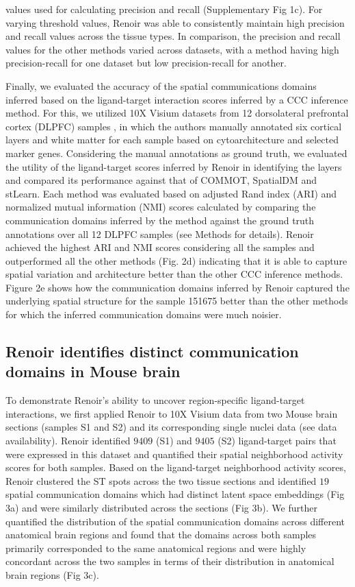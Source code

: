 values used for calculating precision and recall (Supplementary Fig 1c). For varying threshold values, Renoir was able to consistently maintain high precision and recall values across the tissue types. In comparison, the precision and recall values for the other methods varied across datasets, with a method having high precision-recall for one dataset but low precision-recall for another. \par 

Finally, we evaluated the accuracy of the spatial communications domains inferred based on the ligand-target interaction scores inferred by a CCC inference method. For this, we utilized 10X Visium datasets from 12 dorsolateral prefrontal cortex (DLPFC) samples \citep{Maynard2021}, in which the authors manually annotated six cortical layers and white matter for each sample based on cytoarchitecture and selected marker genes. Considering the manual annotations as ground truth, we evaluated the utility of the ligand-target scores inferred by Renoir in identifying the layers and compared its performance against that of COMMOT, SpatialDM and stLearn. Each method was evaluated based on adjusted Rand index (ARI) and normalized mutual information (NMI) scores calculated by comparing the communication domains inferred by the method against the ground truth annotations over all 12 DLPFC samples (see Methods for details). Renoir achieved the highest ARI and NMI scores considering all the samples and outperformed all the other methods (Fig. 2d) indicating that it is able to capture spatial variation and architecture better than the other CCC inference methods. Figure 2e shows how the communication domains inferred by Renoir captured the underlying spatial structure for the sample 151675 better than the other methods for which the inferred communication domains were much noisier.

\subsection*{Renoir identifies distinct communication domains in Mouse brain}

To demonstrate Renoir's ability to uncover region-specific ligand-target interactions, we first applied Renoir to 10X Visium data from two Mouse brain sections (samples S1 and S2) and its corresponding single nuclei data \citep{Kleshchevnikov2022} (see data availability). Renoir identified $9409$ (S1) and $9405$ (S2) ligand-target pairs that were expressed in this dataset and quantified their spatial neighborhood activity scores for both samples. Based on the ligand-target neighborhood activity scores, Renoir clustered the ST spots across the two tissue sections and identified $19$ spatial communication domains which had distinct latent space embeddings (Fig 3a) and were similarly distributed across the sections (Fig 3b). We further quantified the distribution of the spatial communication domains across different anatomical brain regions and found that the domains across both samples primarily corresponded to the same anatomical regions and were highly concordant across the two samples in terms of their distribution in anatomical brain regions (Fig 3c).\par


